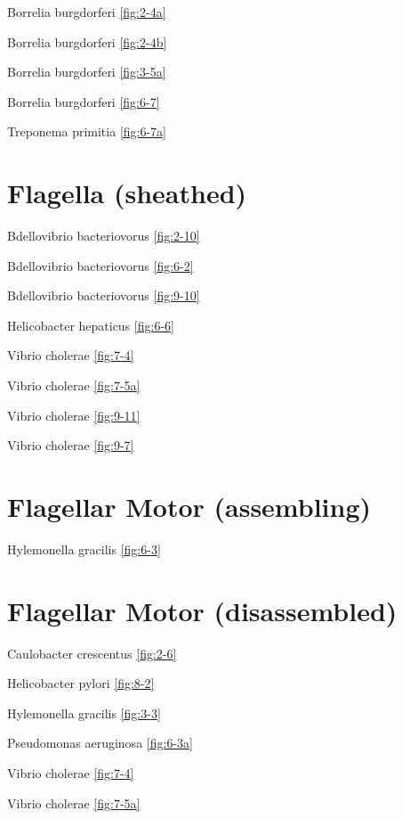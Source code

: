 \documentclass[]{tufte-book}
\begin{document}
Borrelia burgdorferi \ref{fig:2-4a}

Borrelia burgdorferi \ref{fig:2-4b}

Borrelia burgdorferi \ref{fig:3-5a}

Borrelia burgdorferi \ref{fig:6-7}

Treponema primitia \ref{fig:6-7a}

\hypertarget{flagella-sheathed}{%
\section*{Flagella (sheathed)}\label{flagella-sheathed}}

Bdellovibrio bacteriovorus \ref{fig:2-10}

Bdellovibrio bacteriovorus \ref{fig:6-2}

Bdellovibrio bacteriovorus \ref{fig:9-10}

Helicobacter hepaticus \ref{fig:6-6}

Vibrio cholerae \ref{fig:7-4}

Vibrio cholerae \ref{fig:7-5a}

Vibrio cholerae \ref{fig:9-11}

Vibrio cholerae \ref{fig:9-7}

\hypertarget{flagellar-motor-assembling}{%
\section*{Flagellar Motor (assembling)}\label{flagellar-motor-assembling}}

Hylemonella gracilis \ref{fig:6-3}

\hypertarget{flagellar-motor-disassembled}{%
\section*{Flagellar Motor (disassembled)}\label{flagellar-motor-disassembled}}

Caulobacter crescentus \ref{fig:2-6}

Helicobacter pylori \ref{fig:8-2}

Hylemonella gracilis \ref{fig:3-3}

Pseudomonas aeruginosa \ref{fig:6-3a}

Vibrio cholerae \ref{fig:7-4}

Vibrio cholerae \ref{fig:7-5a}
\end{document}
